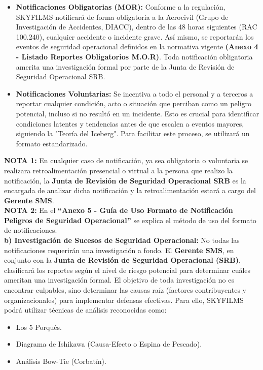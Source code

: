 \begin{itemize}
    \item \textbf{Notificaciones Obligatorias (MOR):} Conforme a la regulación, SKYFILMS notificará de forma obligatoria a la Aerocivil (Grupo de Investigación de Accidentes, DIACC), dentro de las 48 horas siguientes (RAC 100.240), cualquier accidente o incidente grave. Así mismo, se reportarán los eventos de seguridad operacional definidos en la normativa vigente \textbf{(Anexo 4 - Listado Reportes Obligatorios M.O.R)}. Toda notificación obligatoria amerita una investigación formal por parte de la Junta de Revisión de Seguridad Operacional SRB.
    \item \textbf{Notificaciones Voluntarias:} Se incentiva a todo el personal y a terceros a reportar cualquier condición, acto o situación que perciban como un peligro potencial, incluso si no resultó en un incidente. Esto es crucial para identificar condiciones latentes y tendencias antes de que escalen a eventos mayores, siguiendo la "Teoría del Iceberg". Para facilitar este proceso, se utilizará un formato estandarizado.
\end{itemize}

\textbf{NOTA 1:} En cualquier caso de notificación, ya sea obligatoria o voluntaria se realizara retroalimentación presencial o virtual a la persona que realizo la notificación, la \textbf{Junta de Revisión de Seguridad Operacional SRB} es la encargada de analizar dicha notificación y la retroalimentación estará a cargo del \textbf{Gerente SMS}.\\

\textbf{NOTA 2:} En el \textbf{“Anexo 5 - Guía de Uso Formato de Notificación Peligros de Seguridad Operacional”} se explica el método de uso del formato de notificaciones.\\

\textbf{b) Investigación de Sucesos de Seguridad Operacional:} No todas las notificaciones requerirán una investigación a fondo. El \textbf{Gerente SMS}, en conjunto con la \textbf{Junta de Revisión de Seguridad Operacional (SRB)}, clasificará los reportes según el nivel de riesgo potencial para determinar cuáles ameritan una investigación formal. El objetivo de toda investigación no es encontrar culpables, sino determinar las causas raíz (factores contribuyentes y organizacionales) para implementar defensas efectivas. Para ello, SKYFILMS podrá utilizar técnicas de análisis reconocidas como:

\begin{itemize}
    \item Los 5 Porqués.
    \item Diagrama de Ishikawa (Causa-Efecto o Espina de Pescado).
    \item Análisis Bow-Tie (Corbatín).
\end{itemize}

